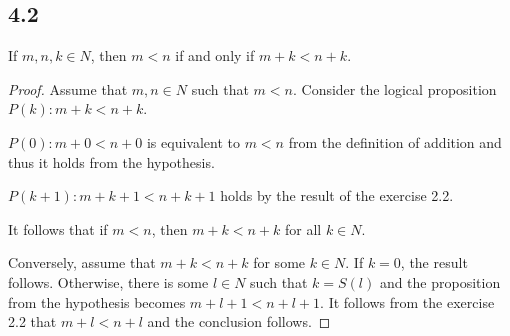 \subsection*{4.2} If $m,n,k \in N$, then $m < n$ if and only if $m + k < n+k$.

\begin{proof}
Assume that $m,n \in N$ such that $m < n$. Consider the logical proposition $P(k): m + k < n + k$.

$P(0): m+0 < n+0$ is equivalent to $m<n$ from the definition of addition and thus it holds from the hypothesis.

$P(k+1): m+k+1 < n+k+1$ holds by the result of the exercise 2.2.

It follows that if $m < n$, then $m + k < n+k$ for all $k \in N$.

\vspace{1em}

Conversely, assume that $m+k < n+k$ for some $k \in N$. If $k = 0$, the result follows. Otherwise, there is some $l \in N$ such that $k = S(l)$ and the proposition from the hypothesis becomes $m+l+1 < n+l+1$. It follows from the exercise 2.2 that $m + l < n+l$ and the conclusion follows.
\end{proof}

